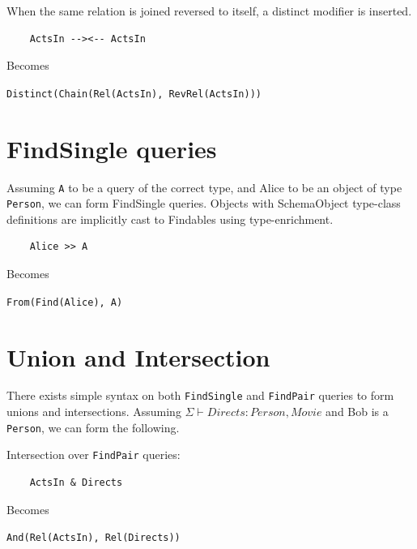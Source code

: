\documentclass[12pt,a4paper,twoside,openright]{report}
\newcommand\codeName[1]{\texttt{#1}}
\newcommand{\typeRule}[2]{\Sigma\vdash #1 \colon #2}
\renewcommand{\baselinestretch}{1.1}    %
\begin{document}
\begin{framed}

When the same relation is joined reversed to itself, a distinct modifier is inserted.

\renewcommand{\baselinestretch}{0.8}
\begin{framed}
\begin{verbatim}
 	ActsIn --><-- ActsIn
\end{verbatim}
\end{framed}
Becomes
\begin{framed}
\codeName{Distinct(Chain(Rel(ActsIn), RevRel(ActsIn)))}
\end{framed}
\end{framed}
\renewcommand{\baselinestretch}{1.1}

\section{FindSingle queries}
Assuming \codeName{A} to be a query of the correct type, and Alice to be an object of type \codeName{Person}, we can form FindSingle queries. Objects with SchemaObject type-class definitions are implicitly cast to Findables using type-enrichment.
\renewcommand{\baselinestretch}{0.8}
\begin{framed}
\begin{framed}
\begin{verbatim}
 	Alice >> A
\end{verbatim}
\end{framed}
Becomes
\begin{framed}
\codeName{From(Find(Alice), A)}
\end{framed}
\end{framed}
\renewcommand{\baselinestretch}{1.1}

\section{Union and Intersection}
There exists simple syntax on both \codeName{FindSingle} and \codeName{FindPair} queries to form unions and intersections.
Assuming $\typeRule{Directs}{Person, Movie}$ and Bob is a \codeName{Person}, we can form the following.

\renewcommand{\baselinestretch}{0.8}
\begin{framed}
Intersection over \codeName{FindPair} queries:
\begin{framed}
\begin{verbatim}
 	ActsIn & Directs
\end{verbatim}
\end{framed}
Becomes
\begin{framed}
\codeName{And(Rel(ActsIn), Rel(Directs))}
\end{framed}
\end{framed}
\end{document}

